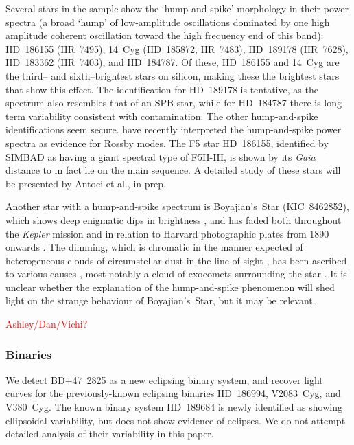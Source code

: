 \documentclass[a4paper,fleqn,usenatbib]{mnras}
\newcommand{\kepler}{\emph{Kepler}\xspace}
\newcommand{\gaia}{\emph{Gaia}\xspace}
\begin{document}
Several stars in the sample show the `hump-and-spike' morphology in their power spectra (a broad `hump' of low-amplitude oscillations dominated by one high amplitude coherent oscillation toward the high frequency end of this band): HD~186155 (HR~7495), 14~Cyg (HD~185872, HR~7483), HD~189178 (HR~7628), HD~183362 (HR~7403), and HD~184787. Of these, HD~186155 and 14~Cyg are the third-- and sixth--brightest stars on silicon, making these the brightest stars that show this effect. The identification for HD~189178 is tentative, as the spectrum also resembles that of an SPB star, while for HD~184787 there is long term variability consistent with contamination. The other hump-and-spike identifications seem secure. \citet{2018MNRAS.474.2774S} have recently interpreted the hump-and-spike power spectra as evidence for Rossby modes. The F5 star HD~186155, identified by SIMBAD as having a giant spectral type of F5II-III, is shown by its \gaia distance to in fact lie on the main sequence. A detailed study of these stars will be presented by Antoci et al., in prep.

Another star with a hump-and-spike spectrum is Boyajian's~Star (KIC~8462852), which shows deep enigmatic dips in brightness \citep{2016MNRAS.457.3988B}, and has faded both throughout the \kepler mission \citep{2016ApJ...830L..39M} and in relation to Harvard photographic plates from 1890 onwards \citep{2016ApJ...822L..34S}. The dimming, which is chromatic in the manner expected of heterogeneous clouds of circumstellar dust in the line of sight \citep{2018ApJ...853..130D,2018arXiv180608842B}, has been ascribed to various causes \citep[reviewed in][]{2018RNAAS...2a..16W}, most notably a cloud of exocomets surrounding the star \citep[e.g.][]{2018MNRAS.473.5286W}. It is unclear whether the explanation of the hump-and-spike phenomenon will shed light on the strange behaviour of Boyajian's~Star, but it may be relevant.

\textcolor{red}{Ashley/Dan/Vichi?}

\subsubsection{Binaries}
\label{ebs}

We detect BD+47~2825 as a new eclipsing binary system, and recover light curves for the previously-known eclipsing binaries HD~186994, V2083~Cyg, and V380~Cyg. The known binary system HD~189684 is newly identified as showing ellipsoidal variability, but does not show evidence of eclipses. We do not attempt detailed analysis of their variability in this paper.
\end{document}
